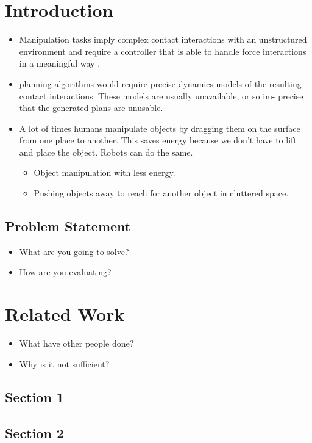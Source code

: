 \documentclass[thesis]{mas_proposal}
\begin{document}
\chapter{Introduction}
\begin{itemize}
    \item Manipulation tasks imply complex contact interactions with an unstructured environment and require a controller that is able to handle force interactions in a meaningful way \cite{kalakrishnan2011learning}.
    \item planning algorithms would require precise dynamics models of the resulting contact interactions. These models are usually unavailable, or so im- precise that the generated plans are unusable\cite{kalakrishnan2011learning}.
    \item A lot of times humans manipulate objects by dragging them on the surface from one place to another. This saves energy because we don't have to lift and place the object. Robots can do the same. 
    \begin{itemize}
    	\item Object manipulation with less energy.
    	\item Pushing objects away to reach for another object in cluttered space.
    \end{itemize}
\end{itemize}

\section{Problem Statement}
\begin{itemize}
    \item What are you going to solve?
    \item How are you evaluating?
\end{itemize}


\chapter{Related Work}
\begin{itemize}
    \item What have other people done?
    \item Why is it not sufficient?
\end{itemize}

\section{Section 1}
\section{Section 2}
\end{document}

